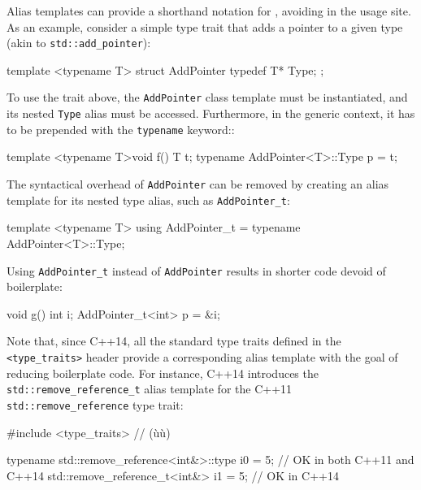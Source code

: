 Alias templates can provide a shorthand notation for , avoiding  in the usage site. As an
example, consider a simple type trait that adds a pointer to a given
type (akin to \lstinline!std::add_pointer!):

\begin{emcppslisting}[emcppsbatch=e4]
template <typename T>
struct AddPointer
{
    typedef T* Type;
};
\end{emcppslisting}

\noindent To use the trait above, the \lstinline!AddPointer! class template must be instantiated, and its nested
\lstinline!Type! alias must be accessed. Furthermore, in the generic context, it has to be prepended with the \lstinline!typename! keyword::

\begin{emcppslisting}[emcppsbatch=e4]
template <typename T>void f()
{
    T t;
    typename AddPointer<T>::Type p = t;
}
\end{emcppslisting}

\noindent The syntactical overhead of \lstinline!AddPointer! can be removed by
creating an alias template for its nested type alias, such as
\lstinline!AddPointer_t!:

\begin{emcppslisting}[emcppsbatch=e4]
template <typename T>
using AddPointer_t = typename AddPointer<T>::Type;
\end{emcppslisting}

\noindent Using \lstinline!AddPointer_t! instead of \lstinline!AddPointer! results in
shorter code devoid of boilerplate:

\begin{emcppslisting}[emcppsbatch=e4]
void g()
{
    int i;
    AddPointer_t<int> p = &i;
}
\end{emcppslisting}

\noindent Note that, since C++14, all
the standard type traits defined in the \lstinline!<type_traits>! header
provide a corresponding alias template with the goal of reducing
boilerplate code. For instance, C++14 introduces the
\lstinline!std::remove_reference_t! alias template for the C++11
\lstinline!std::remove_reference! type trait:

\begin{emcppshiddenlisting}[emcppsbatch=e5]
#include <type_traits>  // (ù{}ù)
\end{emcppshiddenlisting}
\begin{emcppslisting}[emcppsbatch=e5,emcppsstandards={c++14}]
typename std::remove_reference<int&>::type i0 = 5; // OK in both C++11 and C++14
std::remove_reference_t<int&> i1 = 5;              // OK in C++14
\end{emcppslisting}


